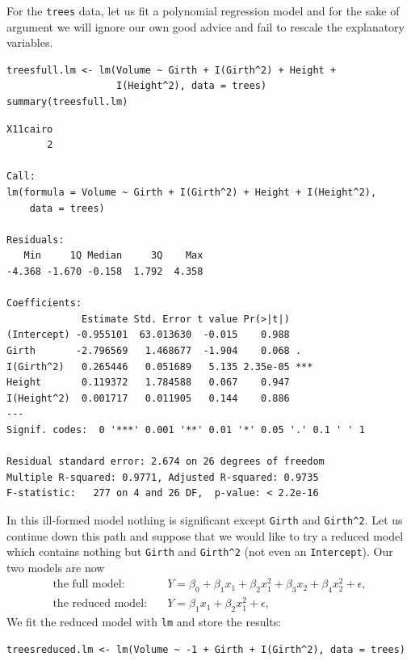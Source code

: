 \documentclass[captions=tableheading]{scrbook}
\begin{document}
\begin{example}
\label{exa:mlr-trees-poly-no-rescale}

For the \texttt{trees} data, let us fit a polynomial regression model and for the sake of argument we will ignore our own good advice and fail to rescale the explanatory variables. 


\begin{verbatim}
treesfull.lm <- lm(Volume ~ Girth + I(Girth^2) + Height + 
                   I(Height^2), data = trees)
summary(treesfull.lm)
\end{verbatim}


\begin{verbatim}
X11cairo 
       2
 
Call:
lm(formula = Volume ~ Girth + I(Girth^2) + Height + I(Height^2), 
    data = trees)

Residuals:
   Min     1Q Median     3Q    Max 
-4.368 -1.670 -0.158  1.792  4.358 

Coefficients:
             Estimate Std. Error t value Pr(>|t|)    
(Intercept) -0.955101  63.013630  -0.015    0.988    
Girth       -2.796569   1.468677  -1.904    0.068 .  
I(Girth^2)   0.265446   0.051689   5.135 2.35e-05 ***
Height       0.119372   1.784588   0.067    0.947    
I(Height^2)  0.001717   0.011905   0.144    0.886    
---
Signif. codes:  0 '***' 0.001 '**' 0.01 '*' 0.05 '.' 0.1 ' ' 1 

Residual standard error: 2.674 on 26 degrees of freedom
Multiple R-squared: 0.9771,	Adjusted R-squared: 0.9735 
F-statistic:   277 on 4 and 26 DF,  p-value: < 2.2e-16
\end{verbatim}

In this ill-formed model nothing is significant except \texttt{Girth} and \texttt{Girth\textasciicircum{}2}. Let us continue down this path and suppose that we would like to try a reduced model which contains nothing but \texttt{Girth} and \texttt{Girth\textasciicircum{}2} (not even an \texttt{Intercept}). Our two models are now
\begin{align*} 
\mbox{the full model:} & \quad Y=\beta_{0}+\beta_{1}x_{1}+\beta_{2}x_{1}^{2}+\beta_{3}x_{2}+\beta_{4}x_{2}^{2}+\epsilon,\\
\mbox{the reduced model:} & \quad Y=\beta_{1}x_{1}+\beta_{2}x_{1}^{2}+\epsilon,
\end{align*}
We fit the reduced model with \texttt{lm} and store the results:


\begin{verbatim}
treesreduced.lm <- lm(Volume ~ -1 + Girth + I(Girth^2), data = trees)
\end{verbatim}


\end{example}
\end{document}
